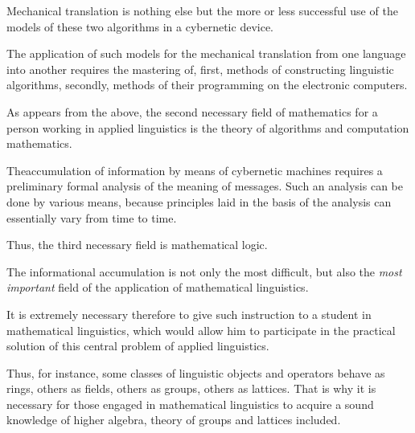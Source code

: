 Mechanical translation is nothing else but the more or less successful
use of the models of these two algorithms in a cybernetic device.

The application of such models for the mechanical translation from one
language into another requires the mastering of, first, methods of
constructing linguistic algorithms, secondly, methods of their
programming on the electronic computers.

As appears from the above, the second necessary field of mathematics
for a person working in applied linguistics is the theory of
algorithms and computation mathematics.

The\pageoriginale accumulation of information by means of cybernetic
machines requires a preliminary formal analysis of the meaning of
messages. Such an analysis can be done by various means, because
principles laid in the basis of the analysis can essentially vary from
time to time.

Thus, the third necessary field is mathematical logic.

The informational accumulation is not only the most difficult, but
also the \textit{most important} field of the application of
mathematical linguistics.

It is extremely necessary therefore to give such instruction to a
student in mathematical linguistics, which would allow him to
participate in the practical solution of this central problem of
applied linguistics.

Thus, for instance, some classes of linguistic objects and operators
behave as rings, others as fields, others as groups, others as
lattices. That is why it is necessary for those engaged in
mathematical linguistics to acquire a sound knowledge of higher
algebra, theory of groups and lattices included.

